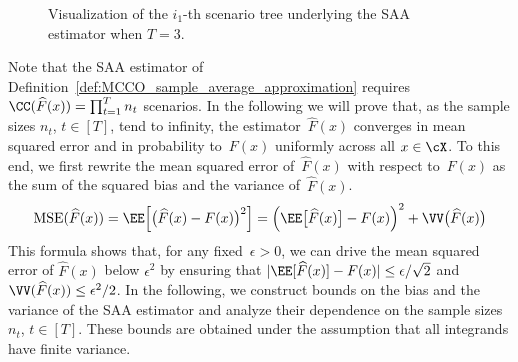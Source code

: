 \documentclass[11pt]{article}
\let\hat\widehat
\begin{document}
\begin{figure}[htb]
    \centering
{}

\caption{Visualization of the $i_1$-th scenario tree underlying the SAA estimator when $T=3$.}
\label{fig:scenario-tree}
\end{figure}




Note that the SAA estimator of Definition~\ref{def:MCCO_sample_average_approximation} requires $\CC(\hat F(x)) = \prod_{t=1}^T n_t$ scenarios. In the following we will prove that, as the sample sizes $n_t$, $t\in[T]$, tend to infinity, the estimator~$\hat{F}(x)$ converges in mean squared error and in probability to~$F(x)$ uniformly across all $x\in\cX$. To this end, we first rewrite the mean squared error of~$\hat{F}(x)$ with respect to~$F(x)$ as the sum of the squared bias and the variance of~$\hat F(x)$. 
\begin{align}\label{eq:mse_decomposition}
    \text{MSE}(\hat{F}(x))=\EE\Big[ \big(\hat{F}(x)-F(x)\big)^2\Big] =\Big(\EE\big[\hat{F}(x) \big] -F(x)\Big)^2 + \VV\big(\hat{F}(x) \big)
\end{align}
This formula shows that, for any fixed~$\epsilon>0$, we can drive the mean squared error of $\hat{F}(x)$ below $\epsilon^2$ by ensuring that $|\EE [\hat{F}(x)] -F(x)|\leq \epsilon/\sqrt{2}$ and $\VV(\hat{F}(x))\leq \epsilon^2/2$. In the following, we construct bounds on the bias and the variance of the SAA estimator and analyze their dependence on the sample sizes~$n_t$, $t\in[T]$. These bounds are obtained under the assumption that all integrands have finite variance.
\end{document}
